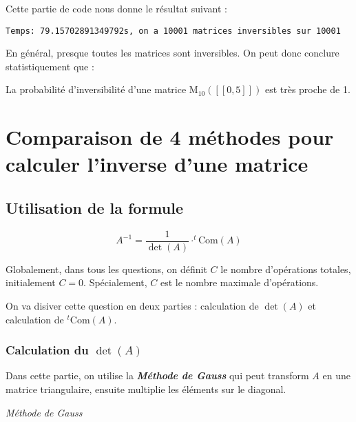 \documentclass{article}
\begin{document}
Cette partie de code nous donne le résultat suivant :

\begin{lstlisting}
Temps: 79.15702891349792s, on a 10001 matrices inversibles sur 10001
\end{lstlisting}

En général, presque toutes les matrices sont inversibles. On peut donc conclure statistiquement que : 

\begin{tcolorbox}
    La probabilité d'inversibilité d'une matrice $\mathrm{M} _{10}( [\![0, 5]\!])$ est très proche de 1.
\end{tcolorbox}
\newpage

\section{Comparaison de 4 méthodes pour calculer l'inverse d'une matrice}

\subsection{Utilisation de la formule}

\[
A^{-1} =  \frac{1}{\det(A)} \cdot ^t \text{Com}(A)
\]

\begin{tcolorbox}
        Globalement, dans tous les questions, on définit $C$ le nombre d'opérations totales, initialement $C=0$. Spécialement, $C$ est le nombre maximale d'opérations.
\end{tcolorbox}

On va disiver cette question en deux parties : calculation de $\det(A)$ et calculation de $^t \text{Com}(A)$.

\subsubsection{Calculation du $\det(A)$} \label{1}

Dans cette partie, on utilise la \textit{\bf{Méthode de Gauss}} qui peut transform $A$ en une matrice triangulaire, ensuite multiplie les éléments sur le diagonal.

\noindent\textit{Méthode de Gauss}
\end{document}
